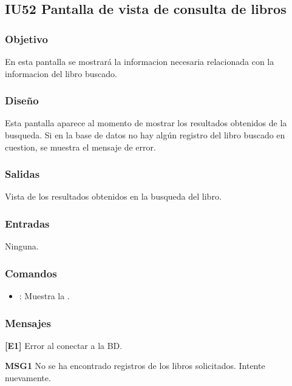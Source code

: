 \newpage
\subsection{IU52 Pantalla de vista de consulta de libros}

\subsubsection{Objetivo}
	En esta pantalla se mostrará la informacion necesaria relacionada con la informacion del libro buscado.  

\subsubsection{Diseño}
	Esta pantalla aparece al momento de mostrar los resultados obtenidos de la busqueda.
	Si en la base de datos no hay algún registro del libro buscado en cuestion, se muestra el mensaje de error. 


\subsubsection{Salidas}
	\begin{Citemize}
		\item Vista de los resultados obtenidos en la busqueda del libro.
	\end{Citemize}
	
\subsubsection{Entradas}
	\begin{Citemize}
		\item Ninguna.
	\end{Citemize}

\subsubsection{Comandos}
\begin{itemize}
	\item {}: Muestra la .
\end{itemize}

\subsubsection{Mensajes}
	\begin{Citemize}
		\item {\bf [E1]} Error al conectar a la BD.
		\item {\bf MSG1} No se ha encontrado registros de los libros solicitados. Intente nuevamente.
	\end{Citemize}